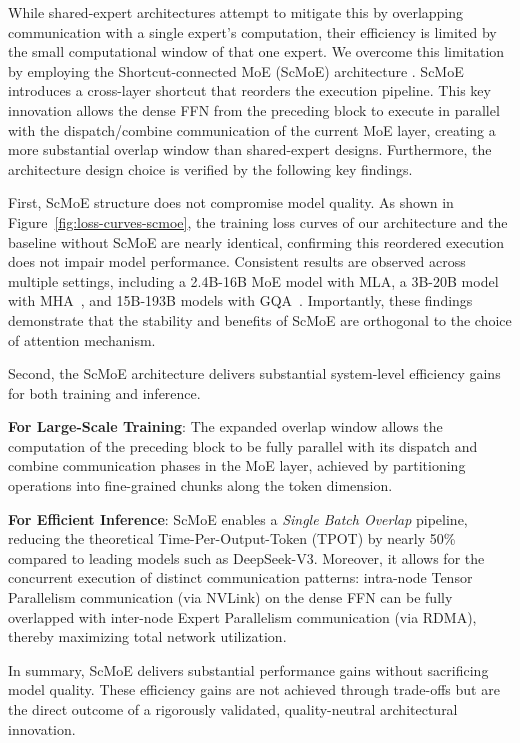 \documentclass{article}
\begin{document}
While shared-expert architectures attempt to mitigate this by overlapping communication with a single expert's computation, their efficiency is limited by the small computational window of that one expert. We overcome this limitation by employing the Shortcut-connected MoE (ScMoE) architecture \citep{cai2024shortcut}. ScMoE introduces a cross-layer shortcut that reorders the execution pipeline. This key innovation allows the dense FFN from the preceding block to execute in parallel with the dispatch/combine communication of the current MoE layer, creating a more substantial overlap window than shared-expert designs. Furthermore, the architecture design choice is verified by the following key findings.

First, ScMoE structure does not compromise model quality. As shown in Figure~\ref{fig:loss-curves-scmoe}, the training loss curves of our architecture and the baseline without ScMoE are nearly identical, confirming this reordered execution does not impair model performance. Consistent results are observed across multiple settings, including a 2.4B-16B MoE model with MLA, a 3B-20B model with MHA~\citep{vaswani2017attention}, and 15B-193B models with GQA~\citep{ainslie2023gqa}. Importantly, these findings demonstrate that the stability and benefits of ScMoE are orthogonal to the choice of attention mechanism.

Second, the ScMoE architecture delivers substantial system-level efficiency gains for both training and inference.

\textbf{For Large-Scale Training}: The expanded overlap window allows the computation of the preceding block to be fully parallel with its dispatch and combine communication phases in the MoE layer, achieved by partitioning operations into fine-grained chunks along the token dimension.

\textbf{For Efficient Inference}: ScMoE enables a \textit{Single Batch Overlap} pipeline, reducing the theoretical Time-Per-Output-Token (TPOT) by nearly 50\% compared to leading models such as DeepSeek-V3. Moreover, it allows for the concurrent execution of distinct communication patterns: intra-node Tensor Parallelism communication (via NVLink) on the dense FFN can be fully overlapped with inter-node Expert Parallelism communication (via RDMA), thereby maximizing total network utilization.

In summary, ScMoE delivers substantial performance gains without sacrificing model quality. These efficiency gains are not achieved through trade-offs but are the direct outcome of a rigorously validated, quality-neutral architectural innovation.
\end{document}
